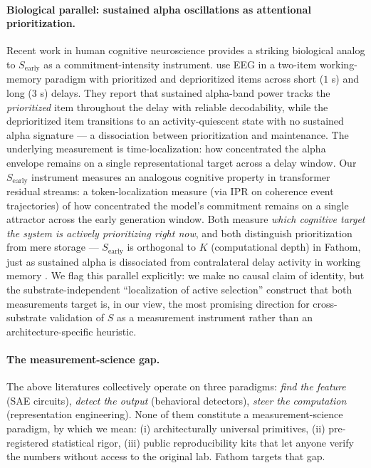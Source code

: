 \documentclass[11pt,letterpaper]{article}
\begin{document}
\paragraph{Biological parallel: sustained alpha oscillations as
attentional prioritization.}
Recent work in human cognitive neuroscience provides a striking biological
analog to $S_{\text{early}}$ as a commitment-intensity instrument.
\citet{weng2026sustained} use EEG in a two-item working-memory paradigm
with prioritized and deprioritized items across short ($1$ s) and long
($3$ s) delays. They report that sustained alpha-band power tracks the
\emph{prioritized} item throughout the delay with reliable decodability,
while the deprioritized item transitions to an activity-quiescent state
with no sustained alpha signature --- a dissociation between
prioritization and maintenance. The underlying measurement is
time-localization: how concentrated the alpha envelope remains on a
single representational target across a delay window. Our
$S_{\text{early}}$ instrument measures an analogous cognitive property in
transformer residual streams: a token-localization measure (via IPR on
coherence event trajectories) of how concentrated the model's commitment
remains on a single attractor across the early generation window. Both
measure \emph{which cognitive target the system is actively prioritizing
right now}, and both distinguish prioritization from mere storage
--- $S_{\text{early}}$ is orthogonal to $K$ (computational depth) in
Fathom, just as sustained alpha is dissociated from contralateral delay
activity in working memory \citep{weng2026sustained}. We flag this
parallel explicitly: we make no causal claim of identity, but the
substrate-independent ``localization of active selection'' construct
that both measurements target is, in our view, the most promising
direction for cross-substrate validation of $S$ as a measurement
instrument rather than an architecture-specific heuristic.

\paragraph{The measurement-science gap.} The above literatures collectively
operate on three paradigms: \emph{find the feature} (SAE circuits),
\emph{detect the output} (behavioral detectors), \emph{steer the computation}
(representation engineering). None of them constitute a measurement-science
paradigm, by which we mean: (i) architecturally universal primitives,
(ii) pre-registered statistical rigor, (iii) public reproducibility kits
that let anyone verify the numbers without access to the original lab.
Fathom targets that gap.
\end{document}
